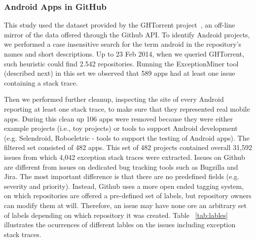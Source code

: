 \documentclass[conference]{IEEEtran}
\begin{document}

\subsubsection{Android Apps in GitHub}
\label{sec:git}


This study used the dataset provided by the GHTorrent project~\cite{Gousi13}, 
an off-line mirror of the data  offered through the Github API.  
To identify Android projects, we performed a case insensitive search for the
term \textsf{android} in the repository's names and short descriptions.  
Up to 23 Feb 2014,  when we queried GHTorrent, such heuristic could
 find 2.542 repositories. Running the ExceptionMiner tool (described next)
 in this set we observed that 589 apps had at least one issue containing a stack trace.

Then we performed further cleanup, inspecting the site of every Android
reporting at least one stack trace, to make sure that they represented real
mobile apps. During this clean up 106 apps were removed because they were either
example projects (i.e., toy projects) or tools to support Android development
(e.g. Selendroid, Roboeletric - tools to support the testing of Android apps).
The filtered set consisted of 482 apps. This set of 482 projects contained overall 31,592 issues from which 4,042 exception stack traces 
were extracted. Issues on Github are different from issues on dedicated bug tracking tools such as 
Bugzilla and Jira. The most important difference is that there are no predefined fields
  (e.g. severity and priority). Instead, Github uses a more open ended tagging system, on which
repositories are offered a pre-defined set of labels, but repository owners can modify 
them at will. Therefore, an issue may have none ore an arbitrary set of labels depending 
on which repository it was created. Table ~\ref{tab:lables} illustrates the ocurrences of different lables 
on the issues including exception stack traces.


\end{document}
